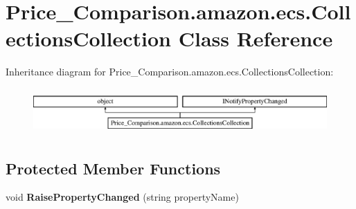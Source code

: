 \hypertarget{class_price___comparison_1_1amazon_1_1ecs_1_1_collections_collection}{\section{Price\-\_\-\-Comparison.\-amazon.\-ecs.\-Collections\-Collection Class Reference}
\label{class_price___comparison_1_1amazon_1_1ecs_1_1_collections_collection}
}


 


Inheritance diagram for Price\-\_\-\-Comparison.\-amazon.\-ecs.\-Collections\-Collection\-:\begin{figure}[H]
\begin{center}
\leavevmode
\includegraphics[height=1.766562cm]{class_price___comparison_1_1amazon_1_1ecs_1_1_collections_collection}
\end{center}
\end{figure}
\subsection*{Protected Member Functions}
\begin{DoxyCompactItemize}
\item 
\hypertarget{class_price___comparison_1_1amazon_1_1ecs_1_1_collections_collection_a156490b3e10ea0cfaf9edf720a70bf4c}{void {\bfseries Raise\-Property\-Changed} (string property\-Name)}\label{class_price___comparison_1_1amazon_1_1ecs_1_1_collections_collection_a156490b3e10ea0cfaf9edf720a70bf4c}

\end{DoxyCompactItemize}

